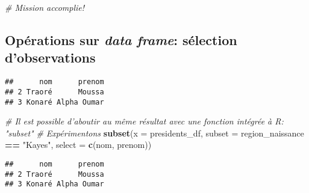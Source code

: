 \documentclass[]{book}
\newenvironment{Shaded}{\begin{snugshade}}{\end{snugshade}}
\newcommand{\KeywordTok}[1]{\textcolor[rgb]{0.13,0.29,0.53}{\textbf{#1}}}
\newcommand{\DataTypeTok}[1]{\textcolor[rgb]{0.13,0.29,0.53}{#1}}
\newcommand{\StringTok}[1]{\textcolor[rgb]{0.31,0.60,0.02}{#1}}
\newcommand{\CommentTok}[1]{\textcolor[rgb]{0.56,0.35,0.01}{\textit{#1}}}
\newcommand{\OperatorTok}[1]{\textcolor[rgb]{0.81,0.36,0.00}{\textbf{#1}}}
\newcommand{\NormalTok}[1]{#1}
\begin{document}
\begin{Shaded}
\begin{Highlighting}[]
\CommentTok{# Mission accomplie!}
\end{Highlighting}
\end{Shaded}

\normalsize

\subsection{\texorpdfstring{Opérations sur \emph{data frame}: sélection
d'observations}{Opérations sur data frame: sélection d'observations}}\label{operations-sur-data-frame-selection-dobservations}

\tiny

\begin{Shaded}
\end{Shaded}

\begin{verbatim}
##      nom      prenom
## 2 Traoré      Moussa
## 3 Konaré Alpha Oumar
\end{verbatim}

\begin{Shaded}
\begin{Highlighting}[]
\CommentTok{# Il est possible d'aboutir au même résultat avec une fonction intégrée à R: "subset"}
\CommentTok{# Expérimentons}
\KeywordTok{subset}\NormalTok{(}\DataTypeTok{x =}\NormalTok{ presidents_df, }\DataTypeTok{subset =}\NormalTok{ region_naissance }\OperatorTok{==}\StringTok{ "Kayes"}\NormalTok{, }\DataTypeTok{select =} \KeywordTok{c}\NormalTok{(nom, prenom))}
\end{Highlighting}
\end{Shaded}

\begin{verbatim}
##      nom      prenom
## 2 Traoré      Moussa
## 3 Konaré Alpha Oumar
\end{verbatim}
\end{document}
